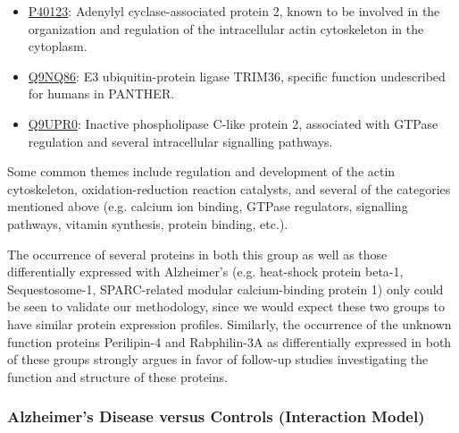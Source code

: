 \begin{itemize}
\item \href{http://www.pantherdb.org/genes/gene.do?acc=HUMAN\%7CHGNC\%3D20039\%7CUniProtKB\%3DP40123}{P40123}: Adenylyl cyclase-associated protein 2, known to be involved in the organization and regulation of the intracellular actin cytoskeleton in the cytoplasm.
\item \href{http://www.pantherdb.org/genes/gene.do?acc=HUMAN\%7CHGNC\%3D16280\%7CUniProtKB\%3DQ9NQ86}{Q9NQ86}: E3 ubiquitin-protein ligase TRIM36, specific function undescribed for humans in PANTHER.
\item \href{http://www.pantherdb.org/genes/gene.do?acc=HUMAN\%7CHGNC\%3D9064\%7CUniProtKB\%3DQ9UPR0}{Q9UPR0}: Inactive phospholipase C-like protein 2, associated with GTPase regulation and several intracellular signalling pathways.
\end{itemize}

Some common themes include regulation and development of the actin cytoskeleton, oxidation-reduction reaction catalysts, and several of the categories mentioned above (e.g. calcium ion binding, GTPase regulators, signalling pathways, vitamin synthesis, protein binding, etc.).

The occurrence of several proteins in both this group as well as those differentially expressed with Alzheimer's (e.g. heat-shock protein beta-1, Sequestosome-1, SPARC-related modular calcium-binding protein 1) only could be seen to validate our methodology, since we would expect these two groups to have similar protein expression profiles. Similarly, the occurrence of the unknown function proteins Perilipin-4 and Rabphilin-3A as differentially expressed in both of these groups strongly argues in favor of follow-up studies investigating the function and structure of these proteins.

\subsubsection{Alzheimer's Disease versus Controls (Interaction Model)}


